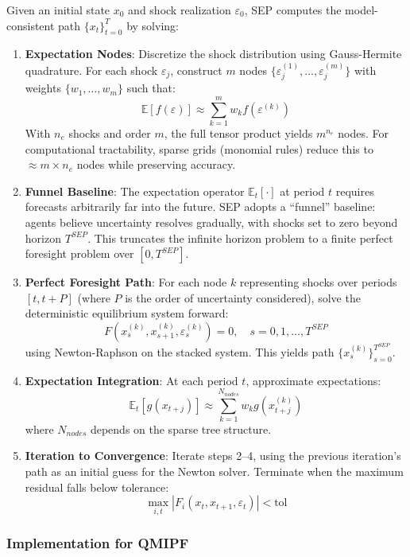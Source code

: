 \documentclass[12pt]{article}
\begin{document}
Given an initial state $x_0$ and shock realization $\varepsilon_0$, SEP computes the model-consistent path $\{x_t\}_{t=0}^T$ by solving:
\begin{enumerate}
\item \textbf{Expectation Nodes}: Discretize the shock distribution using Gauss-Hermite quadrature. For each shock $\varepsilon_j$, construct $m$ nodes $\{\varepsilon_j^{(1)}, \ldots, \varepsilon_j^{(m)}\}$ with weights $\{w_1, \ldots, w_m\}$ such that:
\[
\mathbb{E}[f(\varepsilon)] \approx \sum_{k=1}^m w_k f(\varepsilon^{(k)})
\]
With $n_e$ shocks and order $m$, the full tensor product yields $m^{n_e}$ nodes. For computational tractability, sparse grids (monomial rules) reduce this to $\approx m \times n_e$ nodes while preserving accuracy.

\item \textbf{Funnel Baseline}: The expectation operator $\mathbb{E}_t[\cdot]$ at period $t$ requires forecasts arbitrarily far into the future. SEP adopts a ``funnel'' baseline: agents believe uncertainty resolves gradually, with shocks set to zero beyond horizon $T^{SEP}$. This truncates the infinite horizon problem to a finite perfect foresight problem over $[0, T^{SEP}]$.

\item \textbf{Perfect Foresight Path}: For each node $k$ representing shocks over periods $[t, t+P]$ (where $P$ is the order of uncertainty considered), solve the deterministic equilibrium system forward:
\[
F(x_s^{(k)}, x_{s+1}^{(k)}, \varepsilon_s^{(k)}) = 0, \quad s = 0, 1, \ldots, T^{SEP}
\]
using Newton-Raphson on the stacked system. This yields path $\{x_s^{(k)}\}_{s=0}^{T^{SEP}}$.

\item \textbf{Expectation Integration}: At each period $t$, approximate expectations:
\[
\mathbb{E}_t[g(x_{t+j})] \approx \sum_{k=1}^{N_{nodes}} w_k g(x_{t+j}^{(k)})
\]
where $N_{nodes}$ depends on the sparse tree structure.

\item \textbf{Iteration to Convergence}: Iterate steps 2--4, using the previous iteration's path as an initial guess for the Newton solver. Terminate when the maximum residual falls below tolerance:
\[
\max_{i,t} |F_i(x_t, x_{t+1}, \varepsilon_t)| < \text{tol}
\]
\end{enumerate}

\subsubsection{Implementation for QMIPF}
\end{document}
